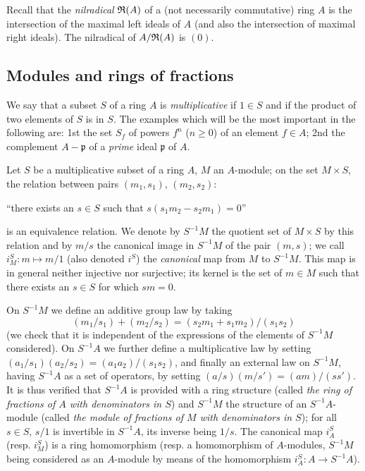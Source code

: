 \begin{env}[1.1.2]
\label{env-0.1.1.2}
Recall that the {\em nilradical} $\mathfrak{R}(A)$ of a (not necessarily
commutative) ring $A$ is the intersection of the maximal left ideals of $A$ (and
also the intersection of maximal right ideals). The nilradical of $A/\mathfrak{R}(A)$
is $(0)$.
\end{env}

\subsection{Modules and rings of fractions}
\label{subsection-modules-and-rings-of-fractions}

\begin{env}[1.2.1]
\label{env-0.1.2.1}
We say that a subset $S$ of a ring $A$ is {\em multiplicative} if $1\in S$ and
if the product of two elements of $S$ is in $S$. The examples which will be the
most important in the following are: 1st the set $S_f$ of
powers $f^n$ ($n\geqslant 0$) of an element $f\in A$; 2nd the
complement $A-\mathfrak{p}$ of a {\em prime} ideal $\mathfrak{p}$ of $A$.
\end{env}

\begin{env}[1.2.2]
\label{env-0.1.2.2}
Let $S$ be a multiplicative subset of a ring $A$, $M$ an $A$-module; on the set
$M\times S$, the relation between pairs $(m_1,s_1)$, $(m_2,s_2)$:
\begin{center}
  ``there exists an $s\in S$ such that $s(s_1 m_2-s_2 m_1)=0$''
\end{center}
is an equivalence relation. We denote by $S^{-1}M$ the quotient set of
$M\times S$ by this relation and by $m/s$ the canonical image in $S^{-1}M$ of
the pair $(m,s)$; we call $i_M^S:m\mapsto m/1$ (also denoted $i^S$) the
{\em canonical} map from $M$ to $S^{-1}M$. This map is in general neither
injective nor surjective; its kernel is the set of $m\in M$ such that there
exists an $s\in S$ for which $sm=0$.

On $S^{-1}M$ we define an additive group law by taking
\[
  (m_1/s_1)+(m_2/s_2)=(s_2 m_1+s_1 m_2)/(s_1 s_2)
\]
(we check that it is independent of the expressions of the elements of $S^{-1}M$
considered). On $S^{-1}A$ we further define a multiplicative law by setting
$(a_1/s_1)(a_2/s_2)=(a_1 a_2)/(s_1 s_2)$, and finally an external law on
$S^{-1}M$, having $S^{-1}A$ as a set of operators, by setting
$(a/s)(m/s')=(am)/(ss')$. It is thus verified that $S^{-1}A$ is provided with a
ring structure (called {\em the ring of fractions of $A$ with denominators in
$S$}) and $S^{-1}M$ the structure of an $S^{-1}A$-module (called {\em the
module of fractions of $M$ with denominators in $S$}); for all $s\in S$, $s/1$
is invertible in $S^{-1}A$, its inverse being $1/s$. The canonical map $i_A^S$
(resp. $i_M^S$) is a ring homomorphism (resp. a homomorphism of $A$-modules,
$S^{-1}M$ being considered as an $A$-module by means of the homomorphism
$i_A^S:A\to S^{-1}A$).
\end{env}

